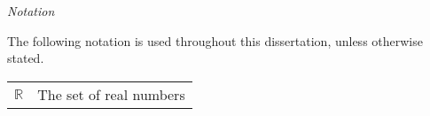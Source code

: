 \thispagestyle{plain}
\begin{center}
    \LARGE{\emph{Notation}}
\end{center}
\vspace{1cm}
The following notation is used throughout this dissertation, unless otherwise stated.
\vspace{1cm}
\begin{center}
	\begin{tabular}{ll}
		$\mathbb{R}$ & The set of real numbers \\
	\end{tabular}
\end{center}
